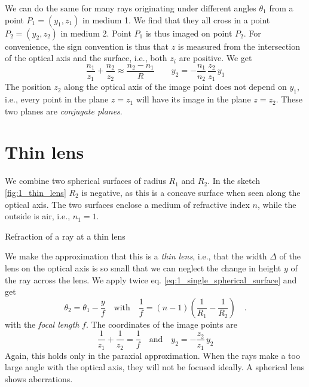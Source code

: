 We can do the same for many rays originating under different angles $\theta_1$ from  a point $P_1 =(y_1, z_1)$ in medium 1. We find that they all cross in a point $P_2 = (y_2, z_2)$ in medium 2. Point $P_1$ is thus imaged on point $P_2$. For convenience, the sign convention is thus that $z$ is measured from the intersection of the optical axis and the surface, i.e., both $z_i$ are positive.
We get
\begin{equation}
    \frac{n_1}{z_1} + \frac{n_2}{z_2} \approx \frac{n_2 - n_1}{R} \qquad 
    y_2 = - \frac{n_1}{n_2} \, \frac{z_2}{z_1} \, y_1
\end{equation}
The position $z_2$ along the optical axis of the image point does not depend on $y_1$, i.e., every point in the plane $z=z_1$ will have its image in the plane $z = z_2$. These two planes are \emph{conjugate planes}.




\section{Thin lens}

We combine two spherical surfaces of radius $R_1$ and $R_2$. In the sketch \ref{fig:1_thin_lens} $R_2$ is negative, as this is a concave surface when seen along the optical axis. The two surfaces enclose a medium of refractive index $n$, while the outside is air, i.e., $n_1 = 1$.

\begin{marginfigure}

   \caption{Refraction of  a ray at a thin lens}
   \label{fig:1_thin_lens}
\end{marginfigure}


We make the approximation that this is a \emph{thin lens}, i.e., that the width $\Delta$ of the lens on the optical axis is so small that we can neglect the change in height $y$ of the ray across the lens. We apply twice eq. \ref{eq:1_single_spherical_surface} and get
\begin{equation}
    \theta_2 = \theta_1 - \frac{y}{f} \quad \text{with} \quad
   \frac{1}{f} = (n-1) \left( \frac{1}{R_1} - \frac{1}{R_2} \right) \quad . 
\end{equation}
with the \emph{focal length} $f$. The coordinates of the image points are
\begin{equation}
    \frac{1}{z_1} + \frac{1}{z_2} = \frac{1}{f} \quad \text{and} \quad 
    y_2 = - \frac{z_2}{z_1} \, y_2
\end{equation}
Again, this holds only in the paraxial approximation. When the rays make a too large angle with the optical axis, they will not be focused ideally. A spherical lens shows aberrations.

